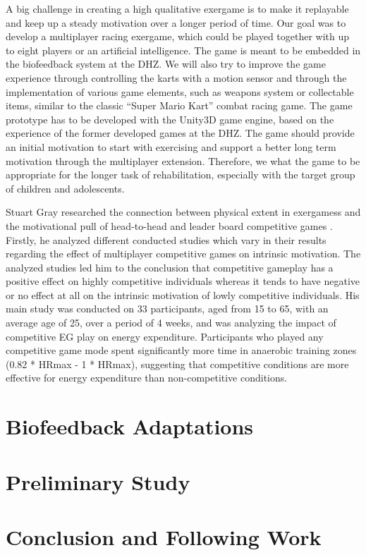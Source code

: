 \begin{multicols}{2}
A big challenge in creating a high qualitative exergame is to make it replayable and keep up a steady motivation over a longer period of time. Our goal was to develop a multiplayer racing exergame, which could be played together with up to eight players or an artificial intelligence. The game is meant to be embedded in the biofeedback system at the DHZ. We will also try to improve the game experience through controlling the karts with a motion sensor and through the implementation of various game elements, such as weapons system or collectable items, similar to the classic “Super Mario Kart” \cite{NitendoWiiMario} combat racing game. The game prototype has to be developed with the Unity3D game engine, based on the experience of the former developed games at the DHZ. The game should provide an initial motivation to start with exercising and support a better long term motivation through the multiplayer extension. Therefore, we what the game to be appropriate for the longer task of rehabilitation, especially with the target group of children and adolescents. 

Stuart Gray researched the connection between physical extent in exergamess and the motivational pull of head-to-head and leader board competitive games \cite{Gray2013}. Firstly, he analyzed different conducted studies which vary in their results regarding the effect of multiplayer competitive games on intrinsic motivation. The analyzed studies led him to the conclusion that competitive gameplay has a positive effect on highly competitive individuals whereas it tends to have negative or no effect at all on the intrinsic motivation of lowly competitive individuals. His main study was conducted on 33 participants, aged from 15 to 65, with an average age of 25, over a period of 4 weeks, and was analyzing the impact of competitive EG play on energy expenditure. Participants who played any competitive game mode spent significantly more time in anaerobic training zones (0.82 * HRmax - 1 * HRmax), suggesting that competitive conditions are more effective for energy expenditure than non-competitive conditions.


\section{Biofeedback Adaptations}

\section{Preliminary Study}

\section{Conclusion and Following Work}


\end{multicols}







